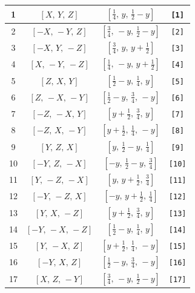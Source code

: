 \documentclass[fleqn,8pt]{jsarticle}
\begin{document}
\begin{longtable}{cccc}
1 & $\left[ X,\, Y,\, Z \right]$ & $\left[ \frac{1}{4},\, y,\, \frac{1}{2} - y \right]$ & {\tt [1]} \\ \hline
2 & $\left[ - X,\, - Y,\, Z \right]$ & $\left[ \frac{3}{4},\, - y,\, \frac{1}{2} - y \right]$ & {\tt [2]} \\ \hline
3 & $\left[ - X,\, Y,\, - Z \right]$ & $\left[ \frac{3}{4},\, y,\, y + \frac{1}{2} \right]$ & {\tt [3]} \\ \hline
4 & $\left[ X,\, - Y,\, - Z \right]$ & $\left[ \frac{1}{4},\, - y,\, y + \frac{1}{2} \right]$ & {\tt [4]} \\ \hline
5 & $\left[ Z,\, X,\, Y \right]$ & $\left[ \frac{1}{2} - y,\, \frac{1}{4},\, y \right]$ & {\tt [5]} \\ \hline
6 & $\left[ Z,\, - X,\, - Y \right]$ & $\left[ \frac{1}{2} - y,\, \frac{3}{4},\, - y \right]$ & {\tt [6]} \\ \hline
7 & $\left[ - Z,\, - X,\, Y \right]$ & $\left[ y + \frac{1}{2},\, \frac{3}{4},\, y \right]$ & {\tt [7]} \\ \hline
8 & $\left[ - Z,\, X,\, - Y \right]$ & $\left[ y + \frac{1}{2},\, \frac{1}{4},\, - y \right]$ & {\tt [8]} \\ \hline
9 & $\left[ Y,\, Z,\, X \right]$ & $\left[ y,\, \frac{1}{2} - y,\, \frac{1}{4} \right]$ & {\tt [9]} \\ \hline
10 & $\left[ - Y,\, Z,\, - X \right]$ & $\left[ - y,\, \frac{1}{2} - y,\, \frac{3}{4} \right]$ & {\tt [10]} \\ \hline
11 & $\left[ Y,\, - Z,\, - X \right]$ & $\left[ y,\, y + \frac{1}{2},\, \frac{3}{4} \right]$ & {\tt [11]} \\ \hline
12 & $\left[ - Y,\, - Z,\, X \right]$ & $\left[ - y,\, y + \frac{1}{2},\, \frac{1}{4} \right]$ & {\tt [12]} \\ \hline
13 & $\left[ Y,\, X,\, - Z \right]$ & $\left[ y + \frac{1}{2},\, \frac{3}{4},\, y \right]$ & {\tt [13]} \\ \hline
14 & $\left[ - Y,\, - X,\, - Z \right]$ & $\left[ \frac{1}{2} - y,\, \frac{1}{4},\, y \right]$ & {\tt [14]} \\ \hline
15 & $\left[ Y,\, - X,\, Z \right]$ & $\left[ y + \frac{1}{2},\, \frac{1}{4},\, - y \right]$ & {\tt [15]} \\ \hline
16 & $\left[ - Y,\, X,\, Z \right]$ & $\left[ \frac{1}{2} - y,\, \frac{3}{4},\, - y \right]$ & {\tt [16]} \\ \hline
17 & $\left[ X,\, Z,\, - Y \right]$ & $\left[ \frac{3}{4},\, - y,\, \frac{1}{2} - y \right]$ & {\tt [17]} \\ \hline

\end{longtable}
\end{document}
